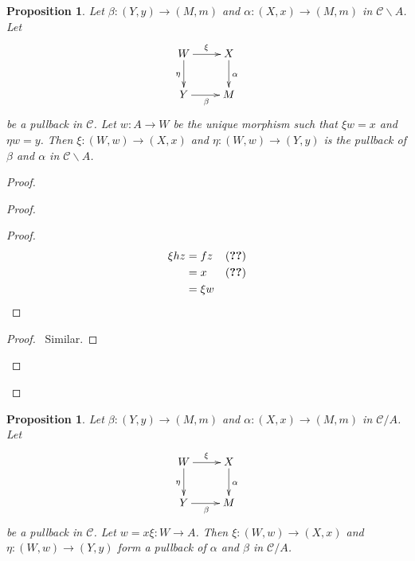 \documentclass{book}
\let\qed\relax
\newtheorem{prop}[ax]{Proposition}
\theoremstyle{definition}
\begin{document}
\begin{prop}
\label{prop:pullback_slice_under}
Let $\beta : (Y,y) \rightarrow (M,m)$ and $\alpha : (X,x) \rightarrow (M,m)$ in $\mathcal{C} \backslash A$. Let
\[ \xymatrix{
W \ar[r]^\xi \ar[d]_\eta & X \ar[d]^\alpha \\
Y \ar[r]_\beta & M
} \]
be a pullback in $\mathcal{C}$. Let $w : A \rightarrow W$ be the unique morphism such that $\xi w = x$ and $\eta w = y$. Then $\xi : (W,w) \rightarrow (X,x)$ and $\eta : (W,w) \rightarrow (Y,y)$ is the pullback of $\beta$ and $\alpha$ in $\mathcal{C} \backslash A$.
\end{prop}

\begin{proof}
\pf
{}
\begin{proof}
	\begin{proof}
		\pf
		\begin{align*}
			\xi h z & = f z & (\text{\stepref{3}}) \\
			& = x & (\text{\stepref{2}}) \\
			& = \xi w
		\end{align*}
	\end{proof}
	\begin{proof}
		\pf\ Similar.
	\end{proof}
\end{proof}
\qed
\end{proof}

\begin{prop}
\label{prop:pullback_slice_over}
Let $\beta : (Y,y) \rightarrow (M,m)$ and $\alpha : (X,x) \rightarrow (M,m)$ in $\mathcal{C} / A$. Let
\[ \xymatrix{
W \ar[r]^\xi \ar[d]_\eta & X \ar[d]^\alpha \\
Y \ar[r]_\beta & M
} \]
be a pullback in $\mathcal{C}$. Let $w = x\xi : W \rightarrow A$. Then $\xi : (W,w) \rightarrow (X,x)$ and $\eta : (W,w) \rightarrow (Y,y)$ form a pullback of $\alpha$ and $\beta$ in $\mathcal{C} / A$.
\end{prop}
\end{document}
